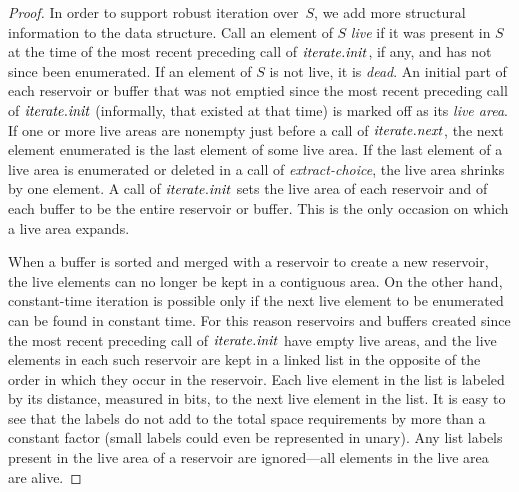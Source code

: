 \documentclass[envcountsame,envcountsect,undated,nolinenumbers]{lnthi}
\def\Tvn#1{\hbox{\textit{#1\/}}}
\begin{document}
\begin{proof}
In order to support robust iteration over~$S$,
we add more structural information to the data structure.
Call an element of $S$ \emph{live} if it was
present in $S$ at the time of the most recent preceding
call of $\Tvn{iterate}.\Tvn{init}$, if any,
and has not since been enumerated.
If an element of $S$ is not live, it is \emph{dead}.
An initial part of each reservoir or buffer
that was not emptied since the most recent preceding call
of $\Tvn{iterate}.\Tvn{init}$
(informally, that existed at that time)
is marked off as its \emph{live area}.
If one or more live areas are nonempty just before
a call of $\Tvn{iterate}.\Tvn{next}$, the next
element enumerated is the last element of some
live area.
If the last element of a live area is enumerated
or deleted in a call of \Tvn{extract-choice},
the live area shrinks by one element.
A call of $\Tvn{iterate}.\Tvn{init}$ sets the live
area of each reservoir and of each buffer to be the
entire reservoir or buffer.
This is the only occasion on which a live area expands.

When a buffer is sorted and merged with a reservoir
to create a new reservoir, the live elements can
no longer be kept in a contiguous area.
On the other hand, constant-time iteration
is possible only if the next live element
to be enumerated can be found in constant time.
For this reason reservoirs and buffers
created since the most recent preceding call of
$\Tvn{iterate}.\Tvn{init}$ have empty live areas,
and the live elements in each such
reservoir are kept in a linked list in the
opposite of the order in which they occur in the reservoir.
Each live element in the list is labeled by its distance,
measured in bits, to the next live element in the list.
It is easy to see that the labels do not add to
the total space requirements by more than a
constant factor (small labels could even
be represented in unary).
Any list labels present in the live area of
a reservoir are ignored---all elements in
the live area are alive.


\end{proof}
\end{document}
